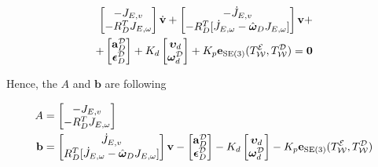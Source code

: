 \begin{equation}
    \begin{aligned}
        \begin{bmatrix}
            - J_{E, v} \\
            - R_D^T J_{E, \omega}
        \end{bmatrix}
        \dot{\mathbf{v}} + 
        \begin{bmatrix}
            - \dot{J}_{E, v} \\
            - R_D^T [
                \dot{J}_{E, \omega} 
                -
                \hat{\boldsymbol{\omega}}_D J_{E, \omega}
            ]
        \end{bmatrix}
        \mathbf{v}
        + \\ +
        \begin{bmatrix}
            \mathbf{a}_D^{\mathcal{D}} \\
            \boldsymbol{\epsilon}_D^{\mathcal{D}}
        \end{bmatrix}
        + K_d
        \begin{bmatrix}
            \boldsymbol{\upsilon}_d\\
            \boldsymbol{\omega}_d^{\mathcal{D}}
        \end{bmatrix}
        + K_p
        \mathbf{e}_{\text{SE}(3)}(T_{\mathcal{W}}^{\mathcal{E}}, T_{\mathcal{W}}^{\mathcal{D}})
        = \mathbf{0}
    \end{aligned}
    \label{eqn:control_e_const_simple}
\end{equation}

Hence, the $A$ and $\mathbf{b}$ are following

\begin{equation}
    \begin{aligned}
        A & = 
        \begin{bmatrix}
            - J_{E, v} \\
            - R_D^T J_{E, \omega}
        \end{bmatrix} \\
        \mathbf{b} & = 
        \begin{bmatrix}
            \dot{J}_{E, v} \\
            R_D^T [
                \dot{J}_{E, \omega} 
                -
                \hat{\boldsymbol{\omega}}_D J_{E, \omega}
            ]
        \end{bmatrix}
        \mathbf{v}
        - 
        \begin{bmatrix}
            \mathbf{a}_D^{\mathcal{D}} \\
            \boldsymbol{\epsilon}_D^{\mathcal{D}}
        \end{bmatrix}
        - K_d
        \begin{bmatrix}
            \boldsymbol{\upsilon}_d\\
            \boldsymbol{\omega}_d^{\mathcal{D}}
        \end{bmatrix}
        - K_p
        \mathbf{e}_{\text{SE}(3)}(T_{\mathcal{W}}^{\mathcal{E}}, T_{\mathcal{W}}^{\mathcal{D}})
    \end{aligned}
    \label{eqn:a_and_b_control}
\end{equation}

